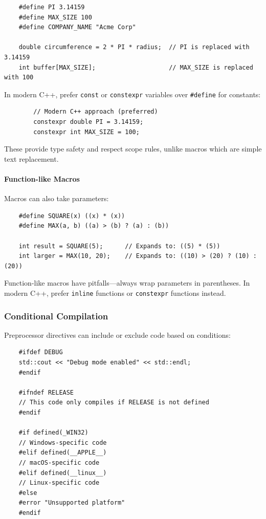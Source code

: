 \begin{lstlisting}
	#define PI 3.14159
	#define MAX_SIZE 100
	#define COMPANY_NAME "Acme Corp"
	
	double circumference = 2 * PI * radius;  // PI is replaced with 3.14159
	int buffer[MAX_SIZE];                    // MAX_SIZE is replaced with 100
\end{lstlisting}

\begin{remark}
	In modern C++, prefer \texttt{const} or \texttt{constexpr} variables over \texttt{\#define} for constants:
	
	\begin{lstlisting}
		// Modern C++ approach (preferred)
		constexpr double PI = 3.14159;
		constexpr int MAX_SIZE = 100;
	\end{lstlisting}
	
	These provide type safety and respect scope rules, unlike macros which are simple text replacement.
\end{remark}

\paragraph{Function-like Macros}

Macros can also take parameters:

\begin{lstlisting}
	#define SQUARE(x) ((x) * (x))
	#define MAX(a, b) ((a) > (b) ? (a) : (b))
	
	int result = SQUARE(5);      // Expands to: ((5) * (5))
	int larger = MAX(10, 20);    // Expands to: ((10) > (20) ? (10) : (20))
\end{lstlisting}

\begin{remark}
	Function-like macros have pitfalls—always wrap parameters in parentheses. In modern C++, prefer \texttt{inline} functions or \texttt{constexpr} functions instead.
\end{remark}

\subsubsection{Conditional Compilation}

Preprocessor directives can include or exclude code based on conditions:

\begin{lstlisting}
	#ifdef DEBUG
	std::cout << "Debug mode enabled" << std::endl;
	#endif
	
	#ifndef RELEASE
	// This code only compiles if RELEASE is not defined
	#endif
	
	#if defined(_WIN32)
	// Windows-specific code
	#elif defined(__APPLE__)
	// macOS-specific code
	#elif defined(__linux__)
	// Linux-specific code
	#else
	#error "Unsupported platform"
	#endif
\end{lstlisting}

